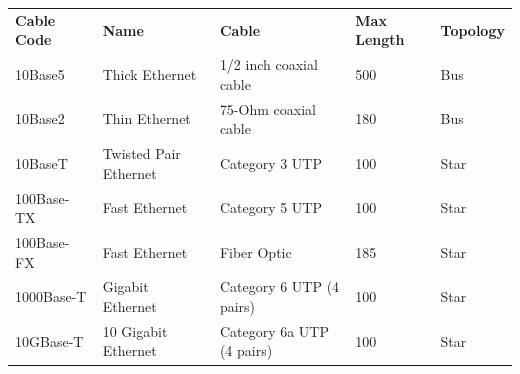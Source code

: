 \begin{center}
    \begin{tabular}{l l l l l}
        \textbf{Cable Code} & \textbf{Name}         & \textbf{Cable}            & \textbf{Max Length} & \textbf{Topology} \\
        10Base5             & Thick Ethernet        & 1/2 inch coaxial cable    & 500                 & Bus               \\
        10Base2             & Thin Ethernet         & 75-Ohm coaxial cable      & 180                 & Bus               \\
        10BaseT             & Twisted Pair Ethernet & Category 3 UTP            & 100                 & Star              \\
        100Base-TX          & Fast Ethernet         & Category 5 UTP            & 100                 & Star              \\
        100Base-FX          & Fast Ethernet         & Fiber Optic               & 185                 & Star              \\
        1000Base-T          & Gigabit Ethernet      & Category 6 UTP (4 pairs)  & 100                 & Star              \\
        10GBase-T           & 10 Gigabit Ethernet   & Category 6a UTP (4 pairs) & 100                 & Star              \\
    \end{tabular}
\end{center}

